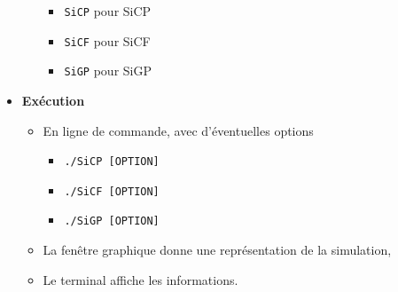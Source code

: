 \begin{itemize}[leftmargin=1cm, label=, itemsep=0pt]
\begin{itemize}[leftmargin=1cm, label=, itemsep=0pt]
		\begin{itemize}[leftmargin=1cm, label=, itemsep=0pt]
		\item \texttt{SiCP} pour SiCP
		\item \texttt{SiCF} pour SiCF
		\item \texttt{SiGP} pour SiGP
		\end{itemize}
	\end{itemize}
%
\item {\bf Exécution}
	\begin{itemize}[leftmargin=1cm, label=, itemsep=0pt]
	\item En ligne de commande, avec d'éventuelles options
		\begin{itemize}[leftmargin=1cm, label=, itemsep=0pt]
		\item \texttt{./SiCP [OPTION]}
		\item \texttt{./SiCF [OPTION]}
		\item \texttt{./SiGP [OPTION]}
		\end{itemize}
	\item La fenêtre graphique donne une représentation de la simulation,
	\item Le terminal affiche les informations.
	\end{itemize}
\end{itemize}

